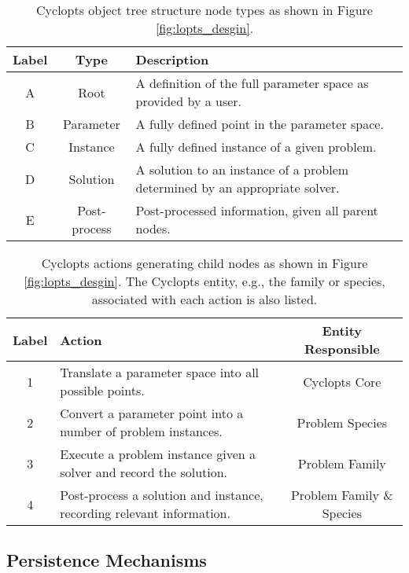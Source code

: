 \begin{table}[h]
\centering
\caption{Cyclopts object tree structure node types as shown in Figure \ref{fig:lopts_desgin}.}
\label{tbl:lopts_nodes}
\begin{tabularx}{\columnwidth-10pt}{|c|c|X|} %
\hline
Label    & Type & Description
\\ \hline
A & Root & A definition of the full parameter space as provided by a user.
\\ \hline
B & Parameter & A fully defined point in the parameter space.
\\ \hline
C & Instance & A fully defined instance of a given problem.
\\ \hline
D & Solution & A solution to an instance of a problem determined by an appropriate solver.
\\ \hline
E & Post-process & Post-processed information, given all parent nodes.
\\ \hline
\end{tabularx}
\end{table}

\begin{table}[h]
\centering
\caption{Cyclopts actions generating child nodes as shown in Figure
  \ref{fig:lopts_desgin}. The Cyclopts entity, e.g., the family or species,
  associated with each action is also listed.}
\label{tbl:lopts_actions}
\begin{tabularx}{\columnwidth-10pt}{|c|X|c|} %
\hline
Label & Action & Entity Responsible
\\ \hline
1 & Translate a parameter space into all possible points. & Cyclopts Core
\\ \hline
2 & Convert a parameter point into a number of problem instances. & Problem Species
\\ \hline
3 & Execute a problem instance given a solver and record the solution. & Problem Family
\\ \hline
4 & Post-process a solution and instance, recording relevant information. & Problem Family \& Species
\\ \hline
\end{tabularx}
\end{table}

\subsection{Persistence Mechanisms}\label{method:tools:hdf5}

